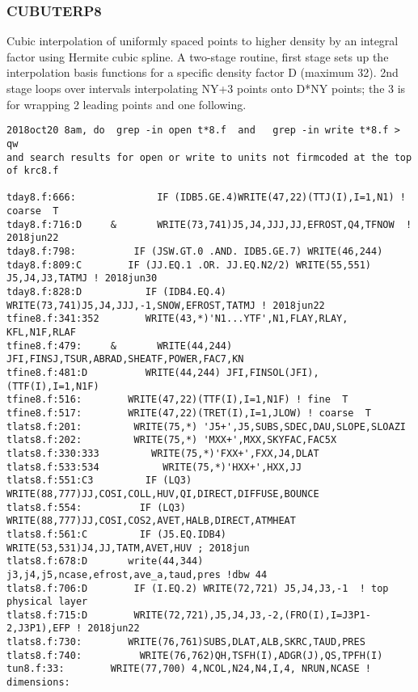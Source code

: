 \subsubsection{CUBUTERP8}

Cubic interpolation of uniformly spaced points to higher density by an integral
factor using Hermite cubic spline. A two-stage routine, first stage sets up the
interpolation basis functions for a specific density factor D (maximum 32). 2nd
stage loops over intervals interpolating NY+3 points onto D*NY points; the 3 is
for wrapping 2 leading points and one following.

\begin{verbatim}
2018oct20 8am, do  grep -in open t*8.f  and   grep -in write t*8.f > qw
and search results for open or write to units not firmcoded at the top of krc8.f

tday8.f:666:              IF (IDB5.GE.4)WRITE(47,22)(TTJ(I),I=1,N1) ! coarse  T
tday8.f:716:D     &       WRITE(73,741)J5,J4,JJJ,JJ,EFROST,Q4,TFNOW  ! 2018jun22
tday8.f:798:          IF (JSW.GT.0 .AND. IDB5.GE.7) WRITE(46,244) 
tday8.f:809:C        IF (JJ.EQ.1 .OR. JJ.EQ.N2/2) WRITE(55,551) J5,J4,J3,TATMJ ! 2018jun30
tday8.f:828:D           IF (IDB4.EQ.4) WRITE(73,741)J5,J4,JJJ,-1,SNOW,EFROST,TATMJ ! 2018jun22
tfine8.f:341:352        WRITE(43,*)'N1...YTF',N1,FLAY,RLAY, KFL,N1F,RLAF
tfine8.f:479:     &       WRITE(44,244) JFI,FINSJ,TSUR,ABRAD,SHEATF,POWER,FAC7,KN 
tfine8.f:481:D          WRITE(44,244) JFI,FINSOL(JFI), (TTF(I),I=1,N1F)
tfine8.f:516:        WRITE(47,22)(TTF(I),I=1,N1F) ! fine  T
tfine8.f:517:        WRITE(47,22)(TRET(I),I=1,JLOW) ! coarse  T
tlats8.f:201:         WRITE(75,*) 'J5+',J5,SUBS,SDEC,DAU,SLOPE,SLOAZI
tlats8.f:202:         WRITE(75,*) 'MXX+',MXX,SKYFAC,FAC5X
tlats8.f:330:333         WRITE(75,*)'FXX+',FXX,J4,DLAT
tlats8.f:533:534           WRITE(75,*)'HXX+',HXX,JJ
tlats8.f:551:C3         IF (LQ3) WRITE(88,777)JJ,COSI,COLL,HUV,QI,DIRECT,DIFFUSE,BOUNCE
tlats8.f:554:          IF (LQ3) WRITE(88,777)JJ,COSI,COS2,AVET,HALB,DIRECT,ATMHEAT
tlats8.f:561:C         IF (J5.EQ.IDB4) WRITE(53,531)J4,JJ,TATM,AVET,HUV ; 2018jun
tlats8.f:678:D       write(44,344) j3,j4,j5,ncase,efrost,ave_a,taud,pres !dbw 44
tlats8.f:706:D        IF (I.EQ.2) WRITE(72,721) J5,J4,J3,-1  ! top physical layer
tlats8.f:715:D        WRITE(72,721),J5,J4,J3,-2,(FRO(I),I=J3P1-2,J3P1),EFP ! 2018jun22
tlats8.f:730:        WRITE(76,761)SUBS,DLAT,ALB,SKRC,TAUD,PRES
tlats8.f:740:          WRITE(76,762)QH,TSFH(I),ADGR(J),QS,TPFH(I)
tun8.f:33:        WRITE(77,700) 4,NCOL,N24,N4,I,4, NRUN,NCASE ! dimensions:
\end{verbatim}   
